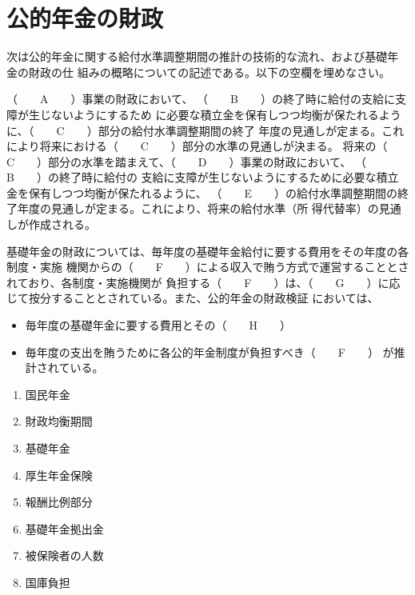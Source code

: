 \section{公的年金の財政}

\begin{fillblank}[年金2 2019 問題1(3)]
  次は公的年金に関する給付水準調整期間の推計の技術的な流れ、および基礎年金の財政の仕
組みの概略についての記述である。以下の空欄を埋めなさい。

\;

（　　A　　）事業の財政において、 （　　B　　）の終了時に給付の支給に支障が生じないようにするため
に必要な積立金を保有しつつ均衡が保たれるように、（　　C　　）部分の給付水準調整期間の終了
年度の見通しが定まる。これにより将来における（　　C　　）部分の水準の見通しが決まる。
将来の（　　C　　）部分の水準を踏まえて、（　　D　　）事業の財政において、 （　　B　　）の終了時に給付の
支給に支障が生じないようにするために必要な積立金を保有しつつ均衡が保たれるように、
（　　E　　）の給付水準調整期間の終了年度の見通しが定まる。これにより、将来の給付水準（所
得代替率）の見通しが作成される。

\;

基礎年金の財政については、毎年度の基礎年金給付に要する費用をその年度の各制度・実施
機関からの（　　F　　）による収入で賄う方式で運営することとされており、各制度・実施機関が
負担する（　　F　　）は、（　　G　　）に応じて按分することとされている。また、公的年金の財政検証
においては、
\begin{itemize}
  \item 毎年度の基礎年金に要する費用とその（　　H　　）
  \item 毎年度の支出を賄うために各公的年金制度が負担すべき（　　F　　）
が推計されている。
\end{itemize}

\end{fillblank}

\begin{answerbox}
  \begin{enumerate}[A: ]
    \item 国民年金
    \item 財政均衡期間
    \item 基礎年金
    \item 厚生年金保険
    \item 報酬比例部分
    \item 基礎年金拠出金
    \item 被保険者の人数
    \item 国庫負担
  \end{enumerate}
\end{answerbox}



